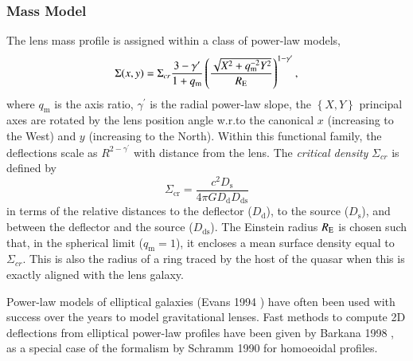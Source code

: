 \documentclass[a4paper,11pt]{article}
\def\qm{q_\mathrm{m}}
\begin{document}
\subsubsection{Mass Model}

The lens mass profile is assigned within a class of power-law models,
%
\begin{equation}
\Sigma(x,y)=\Sigma_{cr}\frac{3-\gamma^{\prime}}{1+\qm}\left(\frac{\sqrt{ X^{2}+\qm^{-2}Y^{2}}}{R_{\rm E}}\right)^{1-\gamma^{\prime}},
\end{equation}
%
where $q_\mathrm{m}$ is the axis ratio, $\gamma^{\prime}$ is the
radial power-law slope, the $\left\{X,Y\right\}$ principal axes are
rotated by the lens position angle w.r.to the canonical $x$
(increasing to the West) and $y$ (increasing to the North).  Within
this functional family, the deflections scale as
$R^{2-\gamma^{\prime}}$ with distance from the lens.  The
\textit{critical density} $\Sigma_{cr}$ is defined by
%
\begin{equation}
\Sigma_{\mathrm{cr}} = \frac{c^{2}D_{\mathrm{s}}}{4\pi G D_{\mathrm{d}} D_{\mathrm{ds}}}
\end{equation}
%
in terms of the relative distances to the deflector ($D_{\mathrm{d}}$), to the
source ($D_{\mathrm{s}}$), and between the deflector and the source
($D_{\mathrm{ds}}$). The Einstein radius $R_{\rm{E}}$ is chosen such that, in the spherical limit ($\qm=1$),
 it encloses a mean surface density equal to $\Sigma_{cr}.$ This is also the radius of a ring traced by the host of
 the quasar when this is exactly aligned with the lens galaxy.

 Power-law models of elliptical galaxies (Evans 1994 \cite{1994MNRAS.267..333E}) have often been used with
success over the years to model gravitational lenses.
 Fast methods to compute 2D deflections from elliptical power-law profiles have been given by Barkana 1998
\cite{1998ApJ...502..531B}, as a special case of the formalism by Schramm 1990 \cite{1990A&A...231...19S} for homoeoidal profiles.
%
%
\end{document}
